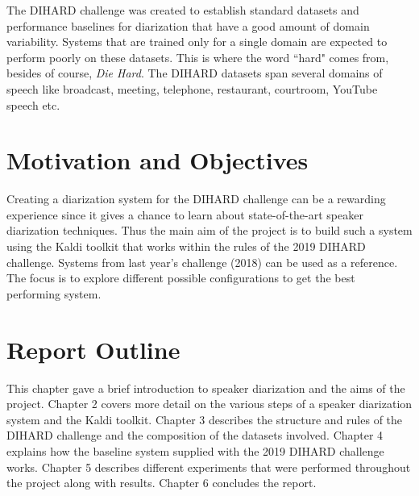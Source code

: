 The DIHARD challenge \cite{ryant2018first} was created to establish standard datasets and performance baselines for diarization that have a good amount of domain variability. Systems that are trained only for a single domain are expected to perform poorly on these datasets. This is where the word ``hard" comes from, besides of course, \emph{Die Hard}. The DIHARD datasets span several domains of speech like broadcast, meeting, telephone, restaurant, courtroom, YouTube speech etc.

\section{Motivation and Objectives}
Creating a diarization system for the DIHARD challenge can be a rewarding experience since it gives a chance to learn about state-of-the-art speaker diarization techniques. Thus the main aim of the project is to build such a system using the Kaldi toolkit \cite{povey2011kaldi} that works within the rules of the 2019 DIHARD challenge. Systems from last year's challenge (2018) can be used as a reference. The focus is to explore different possible configurations to get the best performing system.

\section{Report Outline}
This chapter gave a brief introduction to speaker diarization and the aims of the project. Chapter 2 covers more detail on the various steps of a speaker diarization system and the Kaldi toolkit. Chapter 3 describes the structure and rules of the DIHARD challenge and the composition of the datasets involved. Chapter 4 explains how the baseline system supplied with the 2019 DIHARD challenge works. Chapter 5 describes different experiments that were performed throughout the project along with results. Chapter 6 concludes the report.